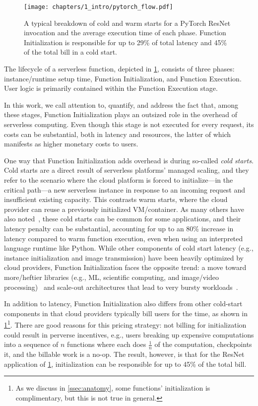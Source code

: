 \documentclass[sigplan,nonacm]{acmart}
\begin{document}
\begin{figure}[t]
\centering
\vspace{1em}
\texttt{[image: chapters/1\_intro/pytorch\_flow.pdf]}
\caption{A typical breakdown of cold and warm starts for a PyTorch ResNet invocation and the average execution time of each phase.
Function Initialization is responsible for up to 29\% of total latency and 45\% of the total bill in a cold start.}
\label{fig:pytorch-flow}
\end{figure}

The lifecycle of a serverless function, depicted in \cref{fig:pytorch-flow}, consists of three phases: instance/runtime setup time, Function Initialization, and Function Execution.
User logic is primarily contained within the Function Execution stage.

In this work, we call attention to, quantify, and address the fact that, among these stages, Function Initialization plays an outsized role in the overhead of serverless computing.
Even though this stage is not executed for every request, its costs can be substantial, both in latency and resources, the latter of which manifests as higher monetary costs to users.

One way that Function Initialization adds overhead is during so-called \textit{cold starts}.
Cold starts are a direct result of serverless platforms' managed scaling, and they refer to the scenario where the cloud platform is forced to initialize---in the critical path---a new serverless instance in response to an incoming request and insufficient existing capacity.
This contrasts warm starts, where the cloud provider can reuse a previously initialized VM/container.
As many others have also noted~\cite{wild2020,faascache2021,faaslight2023}, these cold starts can be common for some applications, and their latency penalty can be substantial, accounting for up to an 80\% increase in latency compared to warm function execution, even when using an interpreted language runtime like Python.
While other components of cold start latency  (e.g., instance initialization and image transmission) have been heavily optimized by cloud providers, Function Initialization faces the opposite trend: a move toward more/heftier libraries (e.g., ML, scientific computing, and image/video processing)~\cite{pypistats} and scale-out architectures that lead to very bursty workloads~\cite{fouladi19gg}.

In addition to latency, Function Initialization also differs from other cold-start components in that cloud providers typically bill users for the time, as shown in \cref{fig:pytorch-flow}\footnote{As we discuss in \cref{ssec:anatomy}, some functions' initialization is complimentary, but this is not true in general.}.
There are good reasons for this pricing strategy: not billing for initialization could result in perverse incentives, e.g., users breaking up expensive computations into a sequence of $n$ functions where each does $\frac{1}{n}$ of the computation, checkpoints it, and the billable work is a no-op.
The result, however, is that for the ResNet application of \cref{fig:pytorch-flow}, initialization can be responsible for up to 45\% of the total bill.
\end{document}
